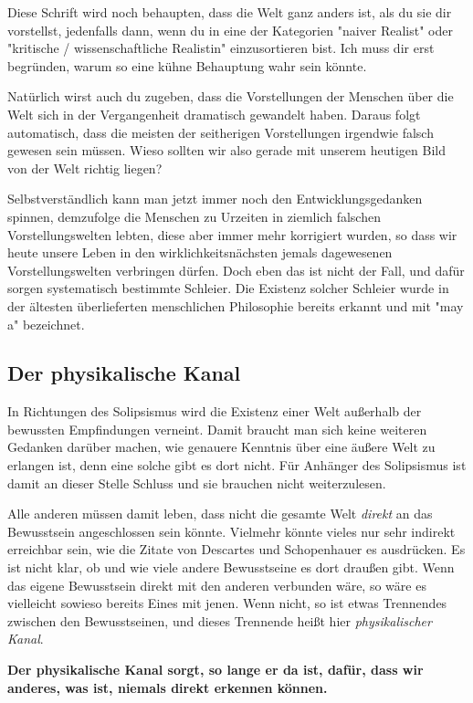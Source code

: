 \documentclass[12pt]{book}
\begin{document}
Diese Schrift wird noch behaupten, dass die Welt ganz anders ist, als du sie dir  vorstellst, jedenfalls dann, wenn du in eine der Kategorien "naiver Realist" oder "kritische / wissenschaftliche Realistin" einzusortieren bist. Ich muss dir erst begründen, warum so eine kühne Behauptung wahr sein könnte.

Natürlich wirst auch du zugeben, dass die Vorstellungen der Menschen über die Welt sich in der Vergangenheit dramatisch gewandelt haben. Daraus folgt automatisch, dass die meisten der seitherigen Vorstellungen irgendwie falsch gewesen sein müssen. Wieso sollten wir also gerade mit unserem heutigen Bild von der Welt richtig liegen?

Selbstverständlich kann man jetzt immer noch den Entwicklungsgedanken spinnen, demzufolge die Menschen zu Urzeiten in ziemlich falschen Vorstellungswelten lebten, diese aber immer mehr korrigiert wurden, so dass wir heute unsere Leben in den wirklichkeitsnächsten jemals dagewesenen Vorstellungswelten verbringen dürfen. Doch eben das ist nicht der Fall, und dafür sorgen systematisch bestimmte Schleier. Die Existenz solcher Schleier wurde in der ältesten überlieferten menschlichen Philosophie bereits erkannt und mit "may				a" bezeichnet.

\subsection{Der physikalische Kanal}

In Richtungen des Solipsismus wird die Existenz einer Welt außerhalb der bewussten Empfindungen verneint. Damit braucht man sich keine weiteren Gedanken darüber machen, wie genauere Kenntnis über eine äußere Welt zu erlangen ist, denn eine solche gibt es dort nicht. Für Anhänger des Solipsismus ist damit an dieser Stelle Schluss und sie brauchen nicht weiterzulesen.

Alle anderen müssen damit leben, dass nicht die gesamte Welt \textit{direkt} an das Bewusstsein angeschlossen sein könnte. Vielmehr könnte vieles nur sehr indirekt erreichbar sein, wie die Zitate von Descartes und Schopenhauer es ausdrücken. Es ist nicht klar, ob und wie viele andere Bewusstseine es dort draußen gibt. Wenn das eigene Bewusstsein direkt mit den anderen verbunden wäre, so wäre es vielleicht sowieso bereits Eines mit jenen. Wenn nicht, so ist etwas Trennendes zwischen den Bewusstseinen, und dieses Trennende heißt hier \textit{physikalischer Kanal}.

\textbf{Der physikalische Kanal sorgt, so lange er da ist, dafür, dass wir anderes, was ist, niemals direkt erkennen können.}
\end{document}
